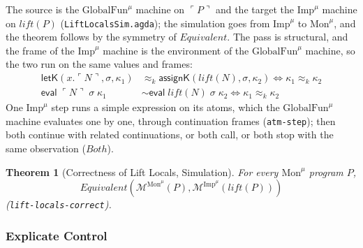 \documentclass[10pt]{article}
\theoremstyle{acmplain}
\newtheorem{theorem}{Theorem}[section]
\newcommand{\key}[1]{\mathsf{#1}}
\newcommand{\pass}[1]{\mathit{#1}}
\newcommand{\ev}[3]{\key{eval}\;#1\;#2\;#3}
\newcommand{\Mach}[1]{\mathcal{M}^{#1}}
\newcommand{\Equiv}{\mathit{Equivalent}}
\newcommand{\Kf}[2]{\key{#1}(#2)}
\newcommand{\evi}[3]{\key{eval}\;#1\;#2\;#3}
\newcommand{\approxk}{\approx_k}
\newcommand{\Tembed}[1]{\ulcorner #1 \urcorner}  %
\newcommand{\Ml}[1]{\textrm{#1}^{\mu}}                  %
\begin{document}
The source is the $\Ml{GlobalFun}$ machine on $\Tembed{P}$ and the target the
$\Ml{Imp}$ machine on $\pass{lift}(P)$ (\texttt{LiftLocalsSim.agda}); the
simulation goes from $\Ml{Imp}$ to $\Ml{Mon}$, and the theorem follows by
the symmetry of $\Equiv$. The pass is structural, and the frame of the
$\Ml{Imp}$ machine is the environment of the $\Ml{GlobalFun}$ machine, so the two
run on the same values and frames:
\begin{align*}
  \Kf{letK}{x.\Tembed{N}, \sigma, \kappa_1} &\approxk \Kf{assignK}{\pass{lift}(N), \sigma, \kappa_2}
    \iff \kappa_1 \approxk \kappa_2 \\
  \ev{\Tembed{N}}{\sigma}{\kappa_1} &\sim \evi{\pass{lift}(N)}{\sigma}{\kappa_2}
    \iff \kappa_1 \approxk \kappa_2
\end{align*}
One $\Ml{Imp}$ step runs a simple expression on its atoms, which the
$\Ml{GlobalFun}$ machine evaluates one by one, through continuation frames
(\texttt{atm-step}); then both continue with related continuations, or
both call, or both stop with the same observation ($\mathit{Both}$).
\begin{theorem}[Correctness of Lift Locals, Simulation]\label{thm:m-cek-lift}
For every $\Ml{Mon}$ program $P$,
\[ \Equiv(\Mach{\Ml{Mon}}(P), \Mach{\Ml{Imp}}(\pass{lift}(P))) \]
(\texttt{lift-locals-correct}).
\end{theorem}

\subsubsection{Explicate Control}
\end{document}

